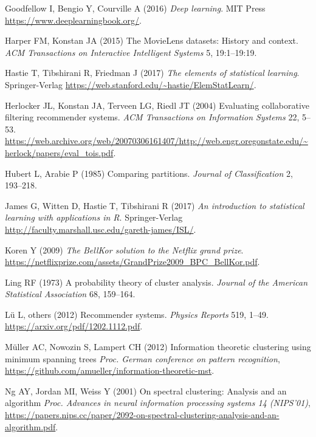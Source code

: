 \documentclass[10pt,b5paper,krantz1]{krantz}
\begin{document}
\leavevmode\hypertarget{ref-deeplearn}{}%
Goodfellow I, Bengio Y, Courville A (2016) \emph{Deep learning}. MIT Press \url{https://www.deeplearningbook.org/}.

\leavevmode\hypertarget{ref-movielens}{}%
Harper FM, Konstan JA (2015) The MovieLens datasets: History and context. \emph{ACM Transactions on Interactive Intelligent Systems} 5, 19:1--19:19.

\leavevmode\hypertarget{ref-esl}{}%
Hastie T, Tibshirani R, Friedman J (2017) \emph{The elements of statistical learning}. Springer-Verlag \url{https://web.stanford.edu/~hastie/ElemStatLearn/}.

\leavevmode\hypertarget{ref-herlocker_etal}{}%
Herlocker JL, Konstan JA, Terveen LG, Riedl JT (2004) Evaluating collaborative filtering recommender systems. \emph{ACM Transactions on Information Systems} 22, 5--53. \url{https://web.archive.org/web/20070306161407/http://web.engr.oregonstate.edu/~herlock/papers/eval_tois.pdf}.

\leavevmode\hypertarget{ref-comparing_paritions}{}%
Hubert L, Arabie P (1985) Comparing partitions. \emph{Journal of Classification} 2, 193--218.

\leavevmode\hypertarget{ref-islr}{}%
James G, Witten D, Hastie T, Tibshirani R (2017) \emph{An introduction to statistical learning with applications in R}. Springer-Verlag \url{http://faculty.marshall.usc.edu/gareth-james/ISL/}.

\leavevmode\hypertarget{ref-bellkor_netflix}{}%
Koren Y (2009) \emph{The BellKor solution to the Netflix grand prize}. \url{https://netflixprize.com/assets/GrandPrize2009_BPC_BellKor.pdf}.

\leavevmode\hypertarget{ref-pre_dbscan}{}%
Ling RF (1973) A probability theory of cluster analysis. \emph{Journal of the American Statistical Association} 68, 159--164.

\leavevmode\hypertarget{ref-lu_etal}{}%
Lü L, others (2012) Recommender systems. \emph{Physics Reports} 519, 1--49. \url{https://arxiv.org/pdf/1202.1112.pdf}.

\leavevmode\hypertarget{ref-itm}{}%
Müller AC, Nowozin S, Lampert CH (2012) Information theoretic clustering using minimum spanning trees \emph{Proc. German conference on pattern recognition}, \url{https://github.com/amueller/information-theoretic-mst}.

\leavevmode\hypertarget{ref-spectral_nips}{}%
Ng AY, Jordan MI, Weiss Y (2001) On spectral clustering: Analysis and an algorithm \emph{Proc. Advances in neural information processing systems 14 (NIPS'01)}, \url{https://papers.nips.cc/paper/2092-on-spectral-clustering-analysis-and-an-algorithm.pdf}.
\end{document}
